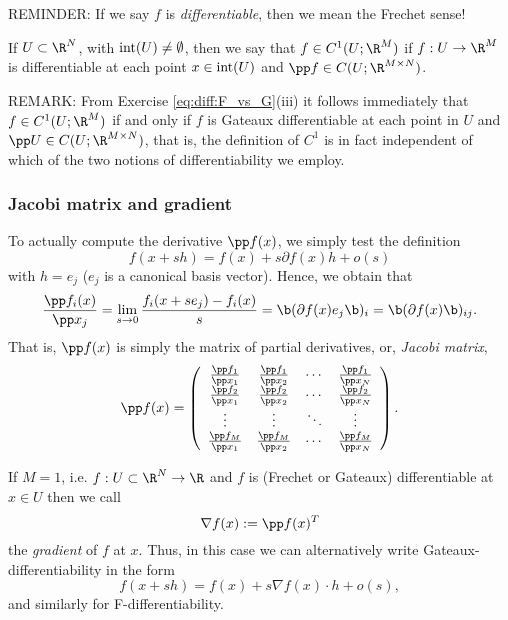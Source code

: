 REMINDER: If we say $f$ is {\em differentiable}, then we mean the
Frechet sense!

\begin{definition}
  If $U \subset \R^N$, with ${\rm int}(U) \neq \emptyset$, then we say
  that $f \in C^1(U; \R^M)$ if $f : U \to \R^{M}$ is differentiable at
  each point $x \in {\rm int}(U)$ and $\pp f \in C(U; \R^{M \times
    N})$.

  REMARK: From Exercise \ref{eq:diff:F_vs_G}(iii) it follows
  immediately that $f \in C^1(U; \R^M)$ if and only if $f$ is Gateaux
  differentiable at each point in $U$ and $\pp U \in C(U; \R^{M\times
    N})$, that is, the definition of $C^1$ is in fact independent of
  which of the two notions of differentiability we employ.
\end{definition}

\subsubsection{Jacobi matrix and gradient}
%
To actually compute the derivative $\pp f(x)$, we simply test the
definition
\begin{displaymath}
  f(x + sh) = f(x) + s\partial f(x) h + o(s)
\end{displaymath}
with $h = e_j$ ($e_j$ is a canonical basis vector). Hence, we obtain
that
\begin{displaymath}
  \frac{\pp f_i(x)}{\pp x_j} = \lim_{s \to 0} \frac{f_i(x+s e_j) -
    f_i(x)}{s} = \b(\partial f(x) e_j\b)_i = \b( \partial f(x) \b)_{ij}.
\end{displaymath}
That is, $\pp f(x)$ is simply the matrix of partial derivatives, or,
{\em Jacobi matrix},
\begin{displaymath}
  \pp f(x) = \left(
    \begin{array}{cccc}
      \frac{\pp f_1}{\pp x_1} & \frac{\pp f_1}{\pp x_2} & \cdots &
      \frac{\pp f_1}{\pp x_N} \\
      \frac{\pp f_2}{\pp x_1} & \frac{\pp f_2}{\pp x_2} & \cdots &
      \frac{\pp f_2}{\pp x_N} \\
      \vdots & \vdots & \ddots &  \vdots\\
      \frac{\pp f_M}{\pp x_1} & \frac{\pp f_M}{\pp x_2} & \cdots &
      \frac{\pp f_M}{\pp x_N}
    \end{array} \right).
\end{displaymath}

If $M = 1$, i.e. $f : U \subset \R^N \to \R$ and $f$ is (Frechet or Gateaux)
differentiable at $x \in U$ then we call
\begin{displaymath}
  \nabla f(x) := \pp f(x)^T
\end{displaymath}
the {\em gradient} of $f$ at $x$. Thus, in this case we can
alternatively write Gateaux-differentiability in the form
\begin{displaymath}
  f(x+sh) = f(x) + s \nabla f(x) \cdot h + o(s),
\end{displaymath}
and similarly for F-differentiability.

